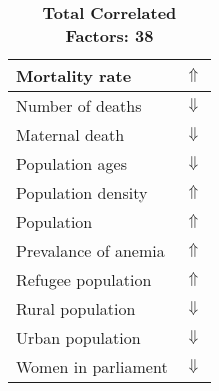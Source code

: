 \documentclass[12pt,notitlepage,oneside]{report}
\begin{document}
\begin{table}[!htb]
\begin{tabular}{|l|l|}
Mortality rate & $\Uparrow$\\ \hline
Number of deaths & $\Downarrow$\\ \hline
Maternal death & $\Downarrow$\\ \hline
Population ages & $\Downarrow$\\ \hline
Population density & $\Uparrow$\\ \hline
Population & $\Uparrow$\\ \hline
Prevalance of anemia & $\Uparrow$\\ \hline
Refugee population & $\Uparrow$\\ \hline
Rural population & $\Downarrow$\\ \hline
Urban population & $\Downarrow$\\ \hline
Women in parliament & $\Downarrow$\\ \hline
\end{tabular}
\caption*{\textbf{Total Correlated Factors: 38}}
\end{table}
\clearpage
\end{document}
